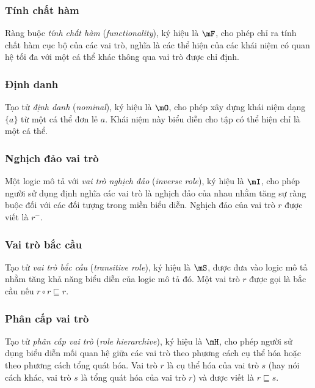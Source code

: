 \subsubsection{Tính chất hàm}
\label{sec:Chap1.Functionality}
Ràng buộc {\em tính chất hàm} ({\em functionality}), ký hiệu là $\mF$, cho phép chỉ ra tính chất hàm cục bộ của các vai trò, nghĩa là các thể hiện của các khái niệm có quan hệ tối đa với một cá thể khác thông qua vai trò được chỉ định.

\subsubsection{Định danh}
\label{sec:Chap1.Nominal}
Tạo tử {\em định danh} ({\em nominal}), ký hiệu là $\mO$, cho phép xây dựng khái niệm dạng $\{a\}$ từ một cá thể đơn lẻ $a$. Khái niệm này biểu diễn cho tập có thể hiện chỉ là một cá thể.

\subsubsection{Nghịch đảo vai trò}
\label{sec:Chap1.RoleInverse}
Một logic mô tả với {\em vai trò nghịch đảo} ({\em inverse role}), ký hiệu là $\mI$, cho phép người sử dụng định nghĩa các vai trò là nghịch đảo của nhau nhằm tăng sự ràng buộc đối với các đối tượng trong miền biểu diễn. Nghịch đảo của vai trò $r$ được viết là $r^-$. 

\subsubsection{Vai trò bắc cầu}
\label{sec:Chap1.Transitive}
Tạo tử {\em vai trò bắc cầu} ({\em transitive role}), ký hiệu là $\mS$, được đưa vào logic mô tả nhằm tăng khả năng biểu diễn của logic mô tả đó. Một vai trò $r$ được gọi là bắc cầu nếu $r \circ r \sqsubseteq r$.

\subsubsection{Phân cấp vai trò}
\label{sec:Chap1.Hierarchive}
Tạo tử {\em phân cấp vai trò} ({\em role hierarchive}), ký hiệu là $\mH$, cho phép người sử dụng biểu diễn mối quan hệ giữa các vai trò theo phương cách cụ thể hóa hoặc theo phương cách tổng quát hóa. Vai trò $r$ là cụ thể hóa của vai trò $s$ (hay nói cách khác, vai trò $s$ là tổng quát hóa của vai trò $r$) và được viết là $r \sqsubseteq s$. 

